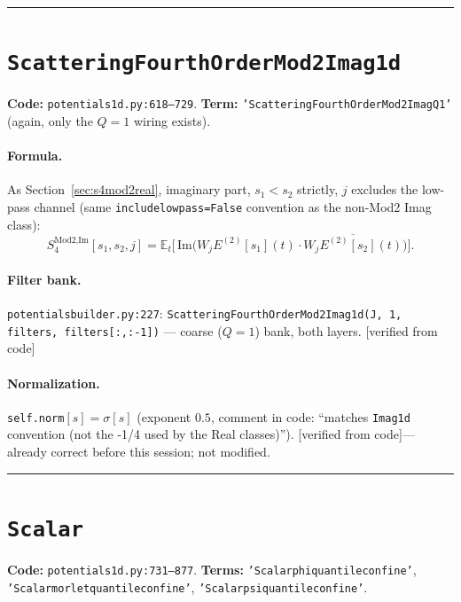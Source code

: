 \documentclass[11pt]{article}
\newcommand{\E}{\mathbb{E}}
\newcommand{\code}[1]{\texttt{#1}}
\renewcommand{\_}{\origunderscore\allowbreak} %
\newcommand{\verified}{\textcolor{blue!50!black}{[verified from code]}}
\begin{document}
\bigskip
\hrule
\bigskip

\section{\code{Scattering\_Fourth\_Order\_Mod2\_Imag\_1d}}
\textbf{Code:} \code{potentials\_1d.py:618--729}. \quad
\textbf{Term:} \code{'Scattering\_Fourth\_Order\_Mod2\_Imag\_Q1'} (again, only
the $Q=1$ wiring exists).

\paragraph{Formula.} As Section~\ref{sec:s4mod2real}, imaginary part, $s_1<s_2$
strictly, $j$ excludes the low-pass channel (same \code{include\_lowpass=False}
convention as the non-Mod2 Imag class):
\begin{equation}
  S_4^{\text{Mod2,Im}}[s_1,s_2,j] = \E_t\Big[\,\mathrm{Im}\big(W_j E^{(2)}[s_1](t)\cdot \overline{W_j E^{(2)}[s_2](t)}\big)\Big].
\end{equation}

\paragraph{Filter bank.} \code{potentials\_builder.py:227}: \code{Scattering\_Fourth\_Order\_Mod2\_Imag\_1d(J, 1, filters, filters[:,:-1])}
— coarse ($Q=1$) bank, both layers. \verified

\paragraph{Normalization.} \code{self.norm}$[s]=\sigma[s]$ (exponent $0.5$,
comment in code: ``matches \code{Imag\_1d} convention (not the -1/4 used by the
Real classes)''). \verified — already correct before this session; not modified.

\bigskip
\hrule
\bigskip

\section{\code{Scalar}}
\textbf{Code:} \code{potentials\_1d.py:731--877}. \quad
\textbf{Terms:} \code{'Scalar\_phi\_quantile\_confine'}, \code{'Scalar\_morlet\_quantile\_confine'},
\code{'Scalar\_psi\_quantile\_confine'}.
\end{document}
